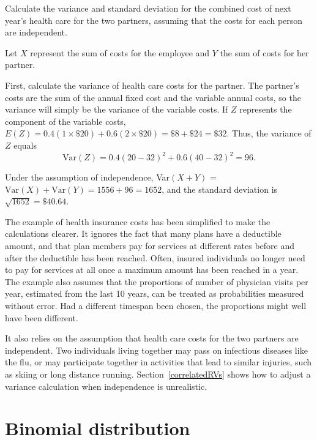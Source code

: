 \begin{examplewrap}
\begin{nexample}{Calculate the variance and standard deviation for the combined cost of next year's health care for the two partners, assuming that the costs for each person are independent.}\label{sdHealthCostsPartners} 

Let $X$ represent the sum of costs for the employee and $Y$ the sum of costs for her partner.
	
First, calculate the variance of health care costs for the partner. The partner's costs are the sum of the annual fixed cost and the variable annual costs, so the variance will simply be the variance of the variable costs. If $Z$ represents the component of the variable costs, $E(Z) = 0.4(1 \times \$20) + 0.6(2 \times \$20) = \$8 + \$24 = \$32$. Thus, the variance of $Z$ equals
\[\textrm{Var}(Z) = 0.4(20 - 32)^2 + 0.6(40 - 32)^2 = 96. \]

Under the assumption of independence, Var$(X + Y)$ = $\text{Var}(X) + \text{Var}(Y) = 1556 + 96 = 1652$, and the standard deviation is $\sqrt{1652} = \$40.64$.
\end{nexample}
\end{examplewrap}

The example of health insurance costs has been simplified to make the calculations clearer.  It ignores the fact that many plans have a deductible amount, and that plan members pay for services at different rates before and after the deductible has been reached. Often, insured individuals no longer need to pay for services at all once a maximum amount has been reached in a year. The example also assumes that the proportions of number of physician visits per year, estimated from the last 10 years, can be treated as probabilities measured without error. Had a different timespan been chosen, the proportions might well have been different.  

It also relies on the assumption that health care costs for the two partners are independent.  Two individuals living together may pass on infectious diseases like the flu, or may participate together in activities that lead to similar injuries, such as skiing or long distance running.  Section~\ref{correlatedRVs} shows how to adjust a variance calculation when independence is unrealistic.




\section{Binomial distribution}
\label{binomialModel}

